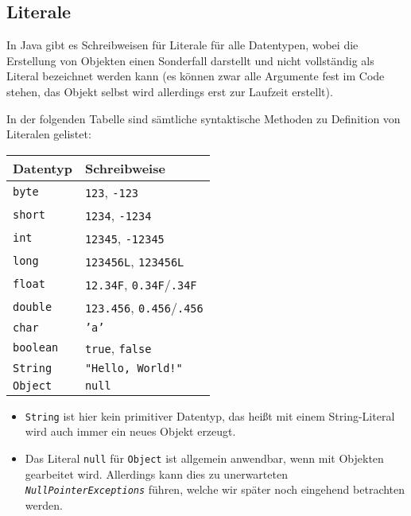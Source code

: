 \subsection{Literale}
	
	In Java gibt es Schreibweisen für Literale für alle Datentypen, wobei die Erstellung von Objekten einen Sonderfall darstellt und nicht vollständig als Literal bezeichnet werden kann (es können zwar alle Argumente fest im Code stehen, das Objekt selbst wird allerdings erst zur Laufzeit erstellt).
	
	In der folgenden Tabelle sind sämtliche syntaktische Methoden zu Definition von Literalen gelistet:
	\begin{table}[H]
		\centering
		\begin{tabular}{l | l}
			\textbf{Datentyp} & \textbf{Schreibweise}                          \\ \hline
			\texttt{byte}     & \texttt{123}, \texttt{-123}                    \\
			\texttt{short}    & \texttt{1234}, \texttt{-1234}                   \\
			\texttt{int}      & \texttt{12345}, \texttt{-12345}                 \\
			\texttt{long}     & \texttt{123456L}, \texttt{123456L}               \\
			\texttt{float}    & \texttt{12.34F}, \texttt{0.34F}/\texttt{.34F}  \\
			\texttt{double}   & \texttt{123.456}, \texttt{0.456}/\texttt{.456} \\
			\texttt{char}     & \texttt{'a'}                                   \\
			\texttt{boolean}  & \texttt{true}, \texttt{false}                  \\
			\texttt{String}   & \texttt{"Hello, World!"}                       \\
			\texttt{Object}   & \texttt{null}
		\end{tabular}
	\end{table}
	\begin{itemize}
		\item \texttt{String} ist hier kein primitiver Datentyp, das heißt mit einem String-Literal wird auch immer ein neues Objekt erzeugt.
		\item Das Literal \texttt{null} für \texttt{Object} ist allgemein anwendbar, wenn mit Objekten gearbeitet wird. Allerdings kann dies zu unerwarteten \textit{\texttt{NullPointerExceptions}} führen, welche wir später noch eingehend betrachten werden.
	\end{itemize}
	
